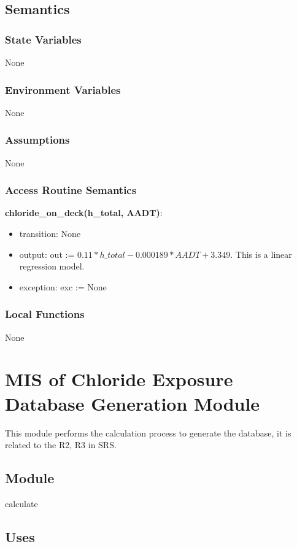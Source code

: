 \documentclass[12pt, titlepage]{article}
\begin{document}
\subsection{Semantics}

\subsubsection{State Variables}
None

\subsubsection{Environment Variables}
None
\subsubsection{Assumptions}
None
\subsubsection{Access Routine Semantics}

\noindent \textbf{chloride\_on\_deck(h\_total, AADT)}:
\begin{itemize}
\item transition: None
\item output: out := $0.11*h\_total - 0.000189*AADT + 3.349$. This is a linear regression model.
\item exception: exc := None
\end{itemize}

\subsubsection{Local Functions}
None
\newpage

\section{MIS of Chloride Exposure Database Generation Module} \label{calculationResultModule}
This module performs the calculation process to generate the database, it is related to the R2, R3 in SRS.


\subsection{Module}

calculate

\subsection{Uses}
\end{document}
